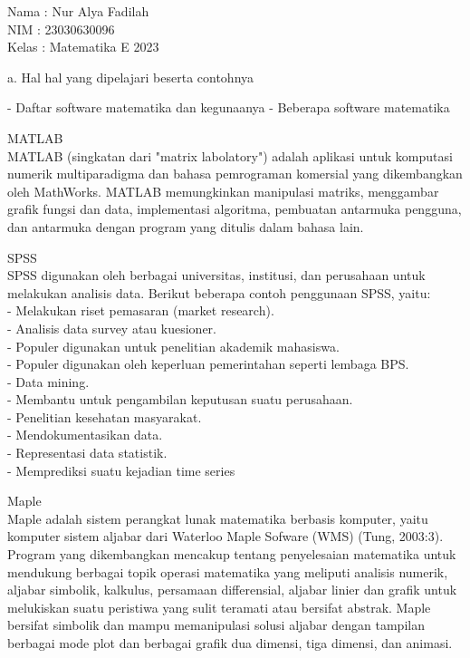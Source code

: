 \documentclass[a4paper,10pt]{article}
\begin{document}
\begin{eulernotebook}
\begin{eulercomment}
Nama  : Nur Alya Fadilah\\
NIM   : 23030630096\\
Kelas : Matematika E 2023

\end{eulercomment}
\eulersubheading{}
\begin{eulercomment}
a. Hal hal yang dipelajari beserta contohnya\\
\end{eulercomment}
\begin{eulerttcomment}
   - Daftar software matematika dan kegunaanya
   - Beberapa software matematika
\end{eulerttcomment}
\begin{eulercomment}
MATLAB\\
MATLAB (singkatan dari "matrix labolatory") adalah aplikasi untuk
komputasi numerik multiparadigma dan bahasa pemrograman komersial yang
dikembangkan oleh MathWorks. MATLAB memungkinkan manipulasi matriks,
menggambar grafik fungsi dan data, implementasi algoritma, pembuatan
antarmuka pengguna, dan antarmuka dengan program yang ditulis dalam
bahasa lain.

SPSS\\
SPSS digunakan oleh berbagai universitas, institusi, dan perusahaan
untuk melakukan analisis data. Berikut beberapa contoh penggunaan
SPSS, yaitu:\\
- Melakukan riset pemasaran (market research).\\
- Analisis data survey atau kuesioner.\\
- Populer digunakan untuk penelitian akademik mahasiswa.\\
- Populer digunakan oleh keperluan pemerintahan seperti lembaga BPS.\\
- Data mining.\\
- Membantu untuk pengambilan keputusan suatu perusahaan.\\
- Penelitian kesehatan masyarakat.\\
- Mendokumentasikan data.\\
- Representasi data statistik.\\
- Memprediksi suatu kejadian time series

Maple\\
Maple adalah sistem perangkat lunak matematika berbasis komputer,
yaitu komputer sistem aljabar dari Waterloo Maple Sofware (WMS) (Tung,
2003:3). Program yang dikembangkan mencakup tentang penyelesaian
matematika untuk mendukung berbagai topik operasi matematika yang
meliputi analisis numerik, aljabar simbolik, kalkulus, persamaan
differensial, aljabar linier dan grafik untuk melukiskan suatu
peristiwa yang sulit teramati atau bersifat abstrak. Maple bersifat
simbolik dan mampu memanipulasi solusi aljabar dengan tampilan
berbagai mode plot dan berbagai grafik dua dimensi, tiga dimensi, dan
animasi.


\end{eulercomment}
\end{eulernotebook}
\end{document}

